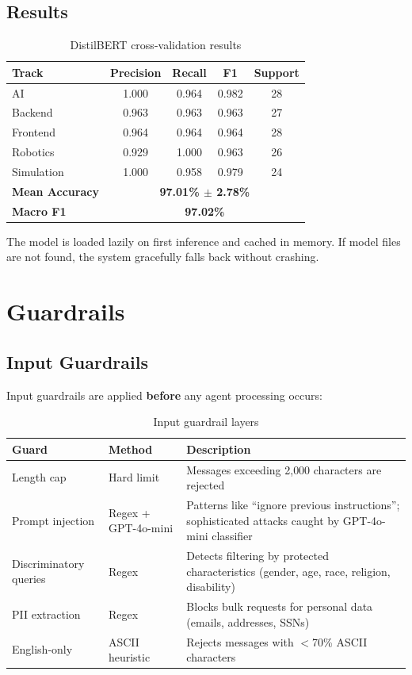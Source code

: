 \documentclass[12pt, a4paper]{article}
\begin{document}
\subsection{Results}

\begin{table}[H]
\centering
\caption{DistilBERT cross-validation results}
\begin{tabular}{l c c c c}
\toprule
\textbf{Track} & \textbf{Precision} & \textbf{Recall} & \textbf{F1} & \textbf{Support} \\
\midrule
AI & 1.000 & 0.964 & 0.982 & 28 \\
Backend & 0.963 & 0.963 & 0.963 & 27 \\
Frontend & 0.964 & 0.964 & 0.964 & 28 \\
Robotics & 0.929 & 1.000 & 0.963 & 26 \\
Simulation & 1.000 & 0.958 & 0.979 & 24 \\
\midrule
\textbf{Mean Accuracy} & \multicolumn{4}{c}{\textbf{97.01\% $\pm$ 2.78\%}} \\
\textbf{Macro F1} & \multicolumn{4}{c}{\textbf{97.02\%}} \\
\bottomrule
\end{tabular}
\label{tab:bert_results}
\end{table}

The model is loaded lazily on first inference and cached in memory. If model files are not found, the system gracefully falls back without crashing.

\section{Guardrails}

\subsection{Input Guardrails}

Input guardrails are applied \textbf{before} any agent processing occurs:

\begin{table}[H]
\centering
\caption{Input guardrail layers}
\begin{tabularx}{\textwidth}{l l X}
\toprule
\textbf{Guard} & \textbf{Method} & \textbf{Description} \\
\midrule
Length cap & Hard limit & Messages exceeding 2{,}000 characters are rejected \\
Prompt injection & Regex + GPT-4o-mini & Patterns like ``ignore previous instructions''; sophisticated attacks caught by GPT-4o-mini classifier \\
Discriminatory queries & Regex & Detects filtering by protected characteristics (gender, age, race, religion, disability) \\
PII extraction & Regex & Blocks bulk requests for personal data (emails, addresses, SSNs) \\
English-only & ASCII heuristic & Rejects messages with $<$70\% ASCII characters \\
\bottomrule
\end{tabularx}
\label{tab:input_guards}
\end{table}
\end{document}
